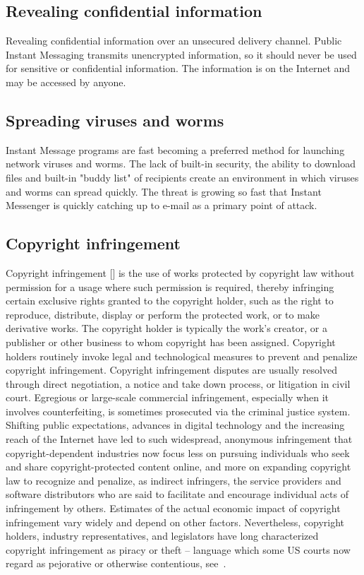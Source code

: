 \subsection{Revealing confidential information}\label{subsec:revealing-confidential-information}
Revealing confidential information over an unsecured delivery channel.
Public Instant Messaging transmits unencrypted information, so it should never be used for sensitive or confidential
information.
The information is on the Internet and may be accessed by anyone.

\subsection{Spreading viruses and worms}\label{subsec:spreading-viruses-and-worms}
Instant Message programs are fast becoming a preferred method for launching network viruses and worms.
The lack of built-in security, the ability to download files and built-in "buddy list" of recipients create an
environment in which viruses and worms can spread quickly.
The threat is growing so fast that Instant Messenger is quickly catching up to e-mail as a primary point of attack.

\subsection{Copyright infringement}\label{subsec:copyright-infringement}
Copyright infringement [\cite{hardy2002criminal}] is the use of works protected by copyright law without
permission for a usage where such permission is required, thereby infringing certain exclusive rights granted to the
copyright holder, such as the right to reproduce, distribute, display or perform the protected work, or to make
derivative works.
The copyright holder is typically the work's creator, or a publisher or other business to whom copyright has been assigned.
Copyright holders routinely invoke legal and technological measures to prevent and penalize copyright infringement.
Copyright infringement disputes are usually resolved through direct negotiation, a notice and take down process, or
litigation in civil court.
Egregious or large-scale commercial infringement, especially when it involves counterfeiting, is sometimes prosecuted
via the criminal justice system.
Shifting public expectations, advances in digital technology and the increasing reach of the Internet have led to such
widespread, anonymous infringement that copyright-dependent industries now focus less on pursuing individuals who seek
and share copyright-protected content online, and more on expanding copyright law to recognize and
penalize, as indirect infringers, the service providers and software distributors who are said to facilitate and
encourage individual acts of infringement by others.
Estimates of the actual economic impact of copyright infringement vary widely and depend on other factors.
Nevertheless, copyright holders, industry representatives, and legislators have long characterized copyright
infringement as piracy or theft -- language which some US courts now regard as pejorative or otherwise contentious,
see~\cite{powell1984dowling, li2009intellectual}.